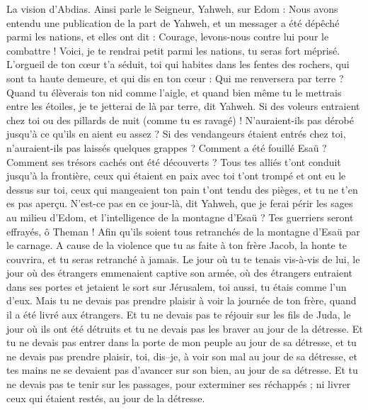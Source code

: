 \begin{multicols}{2}
\VerseOne{}La vision d'Abdias. Ainsi parle le Seigneur, Yahweh, sur Edom : Nous avons entendu une publication de la part de Yahweh, et un messager a été dépêché parmi les nations, et elles ont dit : Courage, levons-nous contre lui pour le combattre !
Voici, je te rendrai petit parmi les nations, tu seras fort méprisé.
L'orgueil de ton cœur t'a séduit, toi qui habites dans les fentes des rochers, qui sont ta haute demeure, et qui dis en ton cœur : Qui me renversera par terre ?
Quand tu élèverais ton nid comme l'aigle, et quand bien même tu le mettrais entre les étoiles, je te jetterai de là par terre, dit Yahweh.
Si des voleurs entraient chez toi ou des pillards de nuit (comme tu es ravagé) ! N'auraient-ils pas dérobé jusqu'à ce qu'ils en aient eu assez ? Si des vendangeurs étaient entrés chez toi, n'auraient-ils pas laissés quelques grappes ?
Comment a été fouillé Esaü ? Comment ses trésors cachés ont été découverts ?
Tous tes alliés t'ont conduit jusqu'à la frontière, ceux qui étaient en paix avec toi t'ont trompé et ont eu le dessus sur toi, ceux qui mangeaient ton pain t'ont tendu des pièges, et tu ne t'en es pas aperçu.
N'est-ce pas en ce jour-là, dit Yahweh, que je ferai périr les sages au milieu d'Edom, et l'intelligence de la montagne d'Esaü ?
Tes guerriers seront effrayés, ô Theman ! Afin qu'ils soient tous retranchés de la montagne d'Esaü par le carnage.
A cause de la violence que tu as faite à ton frère Jacob, la honte te couvrira, et tu seras retranché à jamais.
Le jour où tu te tenais vis-à-vis de lui, le jour où des étrangers emmenaient captive son armée, où des étrangers entraient dans ses portes et jetaient le sort sur Jérusalem, toi aussi, tu étais comme l'un d'eux.
Mais tu ne devais pas prendre plaisir à voir la journée de ton frère, quand il a été livré aux étrangers. Et tu ne devais pas te réjouir sur les fils de Juda, le jour où ils ont été détruits et tu ne devais pas les braver au jour de la détresse.
Et tu ne devais pas entrer dans la porte de mon peuple au jour de sa détresse, et tu ne devais pas prendre plaisir, toi, dis–je, à voir son mal au jour de sa détresse, et tes mains ne se devaient pas d'avancer sur son bien, au jour de sa détresse.
Et tu ne devais pas te tenir sur les passages, pour exterminer ses réchappés ; ni livrer ceux qui étaient restés, au jour de la détresse.

\end{multicols}
